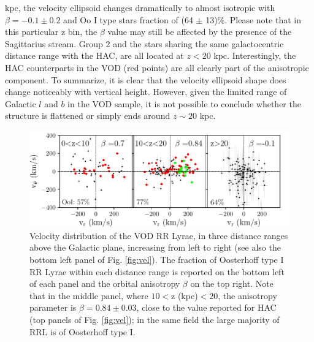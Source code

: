 \documentclass[fleqn,usenatbib]{mnras}
\begin{document}
kpc, the velocity ellipsoid changes dramatically to almost isotropic
with $\beta = -0.1 \pm 0.2$ and Oo I type stars fraction of (64 $\pm$ 13)\%. Please note that in this particular z bin, the $\beta$ value may still be affected by the presence of the
Sagittarius stream. Group 2 and the stars sharing the same
galactocentric distance range with the HAC, are all located at $z<20$
kpc. Interestingly, the HAC counterparts in the VOD (red points) are
all clearly part of the anisotropic component. To summarize, it is
clear that the velocity ellipsoid shape does change noticeably with
vertical height. However, given the limited range of Galactic $l$ and
$b$ in the VOD sample, it is not possible to conclude whether the
structure is flattened or simply ends around $z\sim20$ kpc.
%   
%
\begin{figure}
	        \includegraphics[scale=0.55]{VOD_velocities_vphi_zcuts.pdf}
\vspace{-0.45cm}
   \caption{Velocity distribution of the VOD RR Lyrae, in three distance ranges above the Galactic plane, increasing from left to right (see also the bottom left panel of Fig. 
   \ref{fig:vel}). The fraction of Oosterhoff type I RR Lyrae within each distance range is reported on the bottom left of each panel and the orbital anisotropy $\beta$ on the top right. Note that in the middle panel, where $10<$z (kpc)$<20$, the anisotropy parameter is $\beta=0.84\pm0.03$, close to the value reported for HAC (top panels of  Fig.  \ref{fig:vel}); in the same field the large majority  of RRL is of Oosterhoff type I.}
    \label{fig:VOD_vel}
\end{figure}
%
\end{document}
